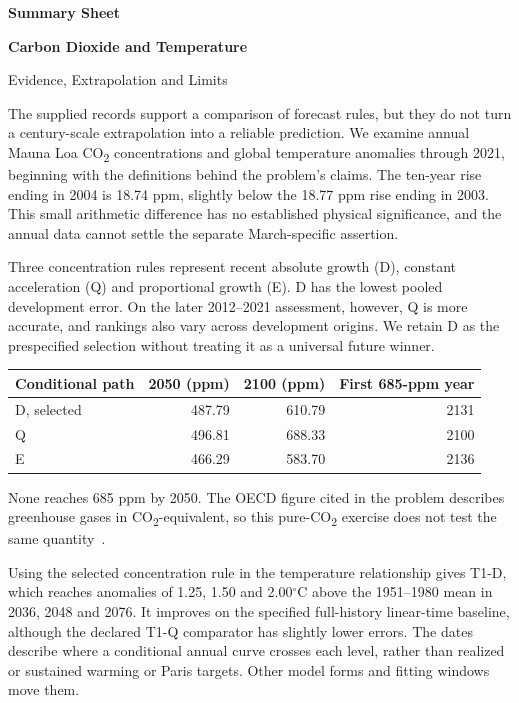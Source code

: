 \documentclass[11pt,a4paper]{article}
\newcommand{\p}[2]{#2\par}
\newcommand{\CO}{CO\textsubscript{2}}
\newcommand{\degC}{\ensuremath{{}^{\circ}\mathrm{C}}}
\begin{document}
\begin{center}
{\large\bfseries Summary Sheet}\par\vspace{9pt}
{\LARGE\bfseries Carbon Dioxide and Temperature}\par\vspace{4pt}
{\large Evidence, Extrapolation and Limits}\par\vspace{10pt}
\end{center}
\p{SUM01}{The supplied records support a comparison of forecast rules, but they do not turn a century-scale extrapolation into a reliable prediction. We examine annual Mauna Loa \CO{} concentrations and global temperature anomalies through 2021, beginning with the definitions behind the problem's claims. The ten-year rise ending in 2004 is 18.74 ppm, slightly below the 18.77 ppm rise ending in 2003. This small arithmetic difference has no established physical significance, and the annual data cannot settle the separate March-specific assertion.}
\p{SUM02}{Three concentration rules represent recent absolute growth (D), constant acceleration (Q) and proportional growth (E). D has the lowest pooled development error. On the later 2012--2021 assessment, however, Q is more accurate, and rankings also vary across development origins. We retain D as the prespecified selection without treating it as a universal future winner.}
\begin{center}\small
\begin{tabular}{lrrr}\toprule
Conditional path & 2050 (ppm) & 2100 (ppm) & First 685-ppm year\\\midrule
D, selected & 487.79 & 610.79 & 2131\\
Q & 496.81 & 688.33 & 2100\\
E & 466.29 & 583.70 & 2136\\\bottomrule
\end{tabular}
\end{center}
\p{SUM03}{None reaches 685 ppm by 2050. The OECD figure cited in the problem describes greenhouse gases in \CO{}-equivalent, so this pure-\CO{} exercise does not test the same quantity~\cite{oecd}.}
\p{SUM04}{Using the selected concentration rule in the temperature relationship gives T1-D, which reaches anomalies of 1.25, 1.50 and 2.00\degC{} above the 1951--1980 mean in 2036, 2048 and 2076. It improves on the specified full-history linear-time baseline, although the declared T1-Q comparator has slightly lower errors. The dates describe where a conditional annual curve crosses each level, rather than realized or sustained warming or Paris targets. Other model forms and fitting windows move them.}
\end{document}
